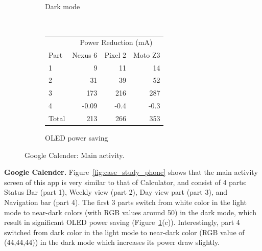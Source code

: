 \begin{figure}[h]
\begin{subfigure}[]{\columnwidth}
		\caption{Dark mode}
	\end{subfigure}
	\\
	\begin{subfigure}[]{\columnwidth}
	\centering
	{ \small
	\begin{tabular}{ | l | r | r | r | }
		\hline
		     & \multicolumn{3}{|c|}{Power Reduction (mA)}\\
		\cline{2-4}
                Part & Nexus 6 & Pixel 2 & Moto Z3 \\
		\hline
		1 &     9 &    11 &    14  \\
		2 &    31 &    39 &    52  \\
		3 &   173 &   216 &   287  \\
		4 & -0.09 &  -0.4 &  -0.3  \\
		\hline
		Total   & 213 & 266 & 353  \\
		\hline
	\end{tabular}
	}
	\caption{OLED power saving}		
        \vspace{-0.1in}
	\end{subfigure}
	\caption{Google Calender: Main activity.}
	\label{fig:case_study_calender}
\end{figure}

{\bf Google Calender.} Figure~\ref{fig:case_study_phone} shows that the
main activity screen of this app is very similar to that of Calculator,
and consist of 4 parts: Status Bar (part 1), Weekly view (part 2), Day
view part (part 3), and Navigation bar (part 4).  The first 3 parts
switch from white color in the light mode to near-dark colors (with
RGB values around 50) in the dark mode, which result in significant
OLED power saving (Figure~\ref{fig:case_study_calender}(c)).
Interestingly, part 4 switched from dark color in the light mode
to near-dark color (RGB value of (44,44,44)) in the dark mode which increases
its power draw slightly.


